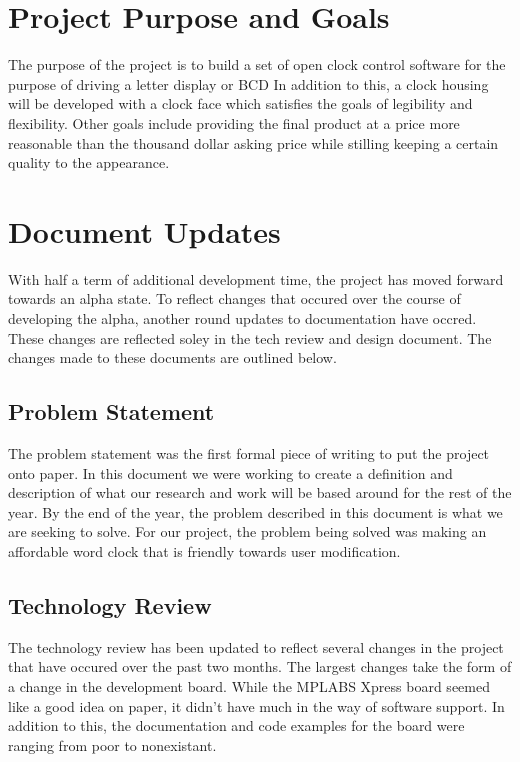 \documentclass[onecolumn, draftclsnofoot,10pt, compsoc]{IEEEtran}
\begin{document}
\section{Project Purpose and Goals}
The purpose of the project is to build a set of open clock control software for the purpose of driving a letter display or BCD
In addition to this, a clock housing will be developed with a clock face which satisfies the goals of legibility and flexibility.
Other goals include providing the final product at a price more reasonable than the thousand dollar asking price while stilling keeping a certain quality to the appearance.

\section{Document Updates}
With half a term of additional development time, the project has moved forward towards an alpha state.
To reflect changes that occured over the course of developing the alpha, another round updates to documentation have occred.
These changes are reflected soley in the tech review and design document.
The changes made to these documents are outlined below.

\subsection{Problem Statement}
The problem statement was the first formal piece of writing to put the project onto paper.
In this document we were working to create a definition and description of what our research and work will be based around for the rest of the year.
By the end of the year, the problem described in this document is what we are seeking to solve.
For our project, the problem being solved was making an affordable word clock that is friendly towards user modification.

\subsection{Technology Review}
The technology review has been updated to reflect several changes in the project that have occured over the past two months.
The largest changes take the form of a change in the development board.
While the MPLABS Xpress board seemed like a good idea on paper, it didn't have much in the way of software support.
In addition to this, the documentation and code examples for the board were ranging from poor to nonexistant.
\end{document}
